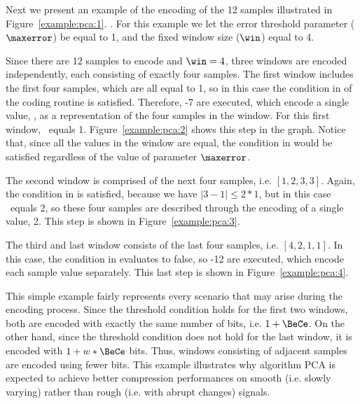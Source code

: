 Next we present an example of the encoding of the 12 samples illustrated in Figure~\ref{example:pca:1}. . For this example we let the error threshold parameter ($\maxerror$) be equal to 1, and the fixed window size ($\win$) equal to 4.


\vspace{+5pt}


Since there are 12 samples to encode and $\win=4$, three windows are encoded independently, each consisting of exactly four samples. The first window includes the first four samples, which are all equal to 1, so in this case the condition in  of the coding routine is satisfied. Therefore, -7 are executed, which encode a single value, \midrange, as a representation of the four samples in the window. For this first window, \midrange\ equals 1. Figure~\ref{example:pca:2} shows this step in the graph. Notice that, since all the values in the window are equal, the condition in  would be satisfied regardless of the value of parameter $\maxerror$.


\vspace{+5pt}


\clearpage


The second window is comprised of the next four samples, i.e. $[1, 2, 3, 3]$. Again, the condition in  is satisfied, because we have $|3 - 1| \leq 2*1$, but in this case \midrange\ equals 2, so these four samples are described through the encoding of a single value, 2. This step is shown in Figure~\ref{example:pca:3}.




The third and last window consists of the last four samples, i.e. $[4, 2, 1, 1]$. In this case, the condition in  evaluates to false, so -12 are executed, which encode each sample value separately. This last step is shown in Figure~\ref{example:pca:4}.


\vspace{+5pt}


This simple example fairly represents every scenario that may arise during the encoding process. Since the threshold condition holds for the first two windows, both are encoded with exactly the same number of bits, i.e. $1+\BeCe$. On the other hand, since the threshold condition does not hold for the last window, it is encoded with $1 + w*\BeCe$ bits. Thus, windows consisting of adjacent samples are encoded using fewer bits. This example illustrates why algorithm PCA is expected to achieve better compression performances on smooth (i.e. slowly varying) rather than rough (i.e. with abrupt changes) signals.


